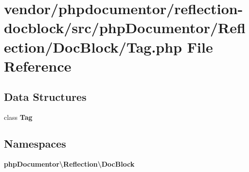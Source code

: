\section{vendor/phpdocumentor/reflection-\/docblock/src/php\+Documentor/\+Reflection/\+Doc\+Block/\+Tag.php File Reference}
\label{_tag_8php}
\subsection*{Data Structures}
\begin{DoxyCompactItemize}
\item 
class {\bf Tag}
\end{DoxyCompactItemize}
\subsection*{Namespaces}
\begin{DoxyCompactItemize}
\item 
 {\bf php\+Documentor\textbackslash{}\+Reflection\textbackslash{}\+Doc\+Block}
\end{DoxyCompactItemize}
